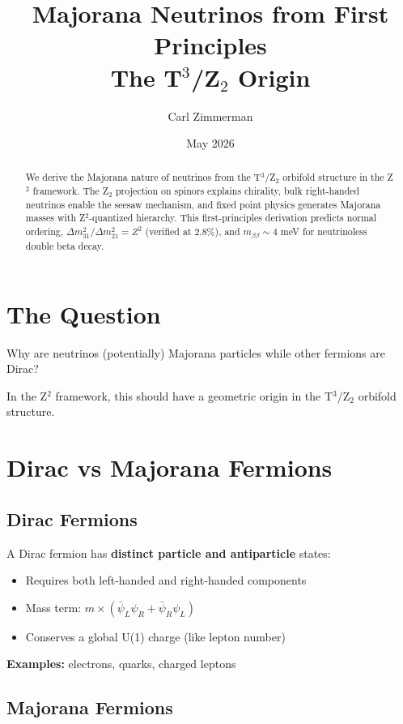 \documentclass[12pt,a4paper]{article}
\title{\textbf{Majorana Neutrinos from First Principles}\\[0.5em]
\large The T$^3$/Z$_2$ Origin}
\author{Carl Zimmerman}
\date{May 2026}
\begin{document}
\maketitle

\begin{abstract}
We derive the Majorana nature of neutrinos from the T$^3$/Z$_2$ orbifold structure in the Z$^2$ framework. The Z$_2$ projection on spinors explains chirality, bulk right-handed neutrinos enable the seesaw mechanism, and fixed point physics generates Majorana masses with Z$^2$-quantized hierarchy. This first-principles derivation predicts normal ordering, $\Delta m^2_{31}/\Delta m^2_{21} = Z^2$ (verified at 2.8\%), and $m_{\beta\beta} \sim 4$ meV for neutrinoless double beta decay.
\end{abstract}

\tableofcontents
\newpage

\section{The Question}

Why are neutrinos (potentially) Majorana particles while other fermions are Dirac?

In the Z$^2$ framework, this should have a geometric origin in the T$^3$/Z$_2$ orbifold structure.

\section{Dirac vs Majorana Fermions}

\subsection{Dirac Fermions}

A Dirac fermion has \textbf{distinct particle and antiparticle} states:
\begin{itemize}
\item Requires both left-handed and right-handed components
\item Mass term: $m \times (\bar{\psi}_L \psi_R + \bar{\psi}_R \psi_L)$
\item Conserves a global U(1) charge (like lepton number)
\end{itemize}

\textbf{Examples:} electrons, quarks, charged leptons

\subsection{Majorana Fermions}
\end{document}
